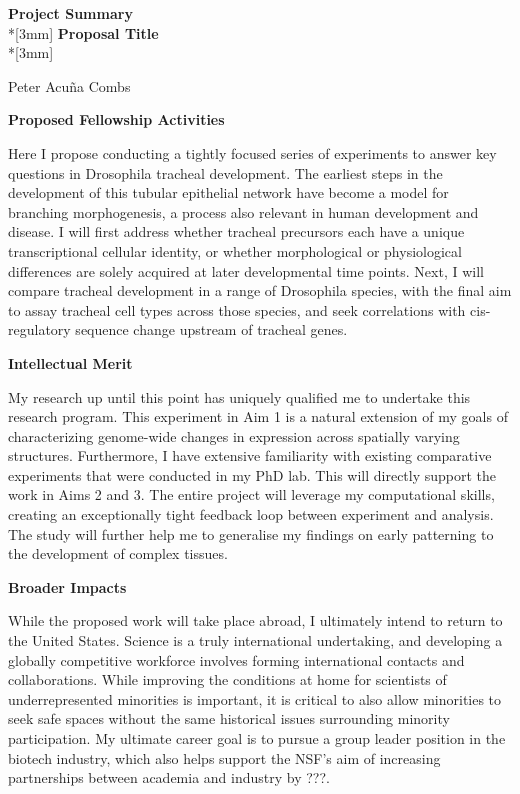 \documentclass{proposal}
\begin{document}
\begin{center}
{\Large{\bf Project Summary}}\\*[3mm]
{\bf Proposal Title} \\*[3mm]

Peter Acu\~na Combs \\

\end{center}

\noindent
{\bf Proposed Fellowship Activities}

Here I propose conducting a tightly focused series of experiments to answer key questions in Drosophila tracheal development. The earliest steps in the development of this tubular epithelial network have become a model for branching morphogenesis, a process also relevant in human development and disease. I will first address whether tracheal precursors each have a unique transcriptional cellular identity, or whether morphological or physiological differences are solely acquired at later developmental time points. Next, I will compare tracheal development in a range of Drosophila species, with the final aim to assay tracheal cell types across those species, and seek correlations with cis-regulatory sequence change upstream of tracheal genes.

\noindent
{\bf Intellectual Merit}

My research up until this point has uniquely qualified me to undertake this research program. This experiment in Aim 1 is a natural extension of my goals of characterizing genome-wide changes in expression across spatially varying structures.  Furthermore,  I have extensive familiarity with existing comparative experiments that were conducted in my PhD lab. This will directly support the work in Aims 2 and 3. The entire project will leverage my computational skills, creating an exceptionally tight feedback loop between experiment and analysis. The study will further help me to generalise my findings on early patterning to the development of complex tissues.

\noindent
{\bf Broader Impacts}

While the proposed work will take place abroad, I ultimately intend to return to the United States.  Science is a truly international undertaking, and developing a globally competitive workforce involves forming international contacts and collaborations.    While improving the conditions at home for scientists of underrepresented minorities is important, it is critical to also allow minorities to seek safe spaces without the same historical issues surrounding minority participation.  My ultimate career goal is to pursue a group leader position in the biotech industry, which also helps support the NSF's aim of increasing partnerships between academia and industry by ???. 
\end{document}
